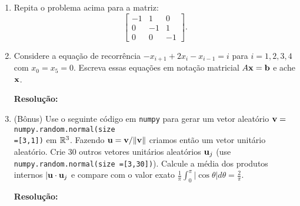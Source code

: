 \documentclass[leqno]{article}
\numberwithin{equation}{section}
\newenvironment{sol}
{
    \vspace{4mm}
    \noindent\textbf{Resolução:}
    \strut\newline
    \smallskip
    \hspace{-3.5mm}
}
{}
\begin{document}
\begin{enumerate}
\item Repita o problema acima para a matriz:
$$\begin{bmatrix}
-1 & 1 & 0\\
0 & -1 & 1\\
0 & 0 & -1
\end{bmatrix}.$$

\item Considere a equação de recorrência $-x_{i+1} + 2x_i - x_{i-1} = i$ para $i=1,2,3,4$ com $x_0 = x_5 = 0$. Escreva essas equações em notação matricial $A\mathbf{x} = \mathbf{b}$ e ache $\mathbf{x}$.

\begin{sol} 
\end{sol} 

\item (Bônus) Use o seguinte código em \texttt{numpy} para gerar um vetor aleatório $\mathbf{v}=$\texttt{numpy.random.normal(size
\\=[3,1])} em $\mathbb{R}^3$. Fazendo $\mathbf{u} = \mathbf{v}/\|\mathbf{v}\|$ criamos então um vetor unitário aleatório. Crie 30 outros vetores unitários aleatórios $\mathbf{u}_j$ (use \texttt{numpy.random.normal(size
=[3,30])}). Calcule a média dos produtos internos $|\mathbf{u} \cdot \mathbf{u}_j$ e compare com o valor exato $\frac{1}{\pi}\int_0^\pi |\cos \theta| d\theta = \frac{2}{\pi}$.

\begin{sol} 
\end{sol} 
\end{enumerate}
\end{document}
